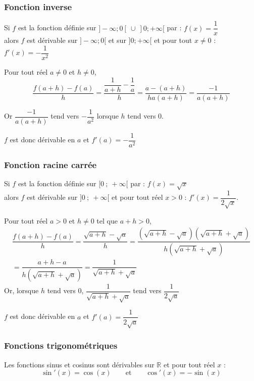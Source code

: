 \documentclass[french]{book}
\newcommand{\R}{\mathbb {R}}
\begin{document}
\subsubsection*{Fonction inverse}
\begin{prop}

Si $f$ est la fonction définie sur $]-\infty;0[~\cup~]0;+\infty[$ par :  $f(x)=\dfrac{1}{x}$ \\
alors $f$ est dérivable sur $]-\infty;0[$ et sur $]0;+\infty[$ et pour tout $x\neq 0$ :  $f'(x)=-\dfrac{1}{x^{2}}$

\end{prop}

\begin{demo}
Pour tout réel $a\neq 0$ et $h\neq 0$, \[\dfrac{f(a+h)-f(a)}{h}=\dfrac{\dfrac{1}{a+h}-\dfrac{1}{a}}{h}=\dfrac{a-(a+h)}{ha(a+h)}=\dfrac{-1}{a(a+h)}\]

Or $\dfrac{-1}{a(a+h)}$ tend vers $-\dfrac{1}{a^{2}}$ lorsque $h$ tend vers 0.

$f$ est donc dérivable en $a$ et $f'(a)=-\dfrac{1}{a^{2}}$
\end{demo}

\subsubsection*{Fonction racine carrée}
\begin{prop}

Si $f$ est la fonction définie sur $[0~;~+\infty[$ par :  $f(x)=\sqrt{x}$ \\
alors $f$ est dérivable sur $]0~;~+\infty[$ et pour tout réel $x>0$ :  $f'(x)=\dfrac{1}{2\sqrt{x}}$.

\end{prop}

\begin{demo}
Pour tout réel $a>0$ et $h\neq 0$ tel que $a+h>0$,
\begin{multline*}
\dfrac{f(a+h)-f(a)}{h}=\dfrac{\sqrt{a+h}-\sqrt{a}}{h}=\dfrac{(\sqrt{a+h}-\sqrt{a})(\sqrt{a+h}+\sqrt{a})}{h(\sqrt{a+h}+\sqrt{a})}\\
=\dfrac{a+h-a}{h(\sqrt{a+h}+\sqrt{a})}=\dfrac{1}{\sqrt{a+h}+\sqrt{a}}
\end{multline*}
Or, lorsque $h$ tend vers 0, $\dfrac{1}{\sqrt{a+h}+\sqrt{a}}$ tend vers $\dfrac{1}{2\sqrt{a}}$

$f$ est donc dérivable en $a$ et $f'(a)=\dfrac{1}{2\sqrt{a}}$
\end{demo}

\subsubsection*{Fonctions trigonométriques}
\begin{prop}
Les fonctions sinus et cosinus sont dérivables sur $\R$ et pour tout réel $x$ :
\[\sin'(x)=\cos(x)\hspace{2em}\text{et}\hspace{2em}\cos'(x)=-\sin(x)\]
\end{prop}
\end{document}
